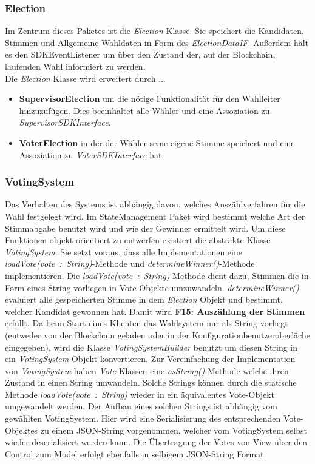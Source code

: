 \documentclass[parskip=full]{scrartcl}
\newcommand{\textitx}[1]{\mbox{\textit{#1}}}
\newcommand{\fakeparagraph}[1]{\textbf{#1}}
\begin{document}
		\subsubsection{Election}
		Im Zentrum dieses Paketes ist die \textitx{Election} Klasse. Sie speichert die Kandidaten, Stimmen und Allgemeine Wahldaten in Form des \textitx{ElectionDataIF}. Außerdem hält es den SDKEventListener um über den Zustand der, auf 
		der Blockchain, laufenden Wahl informiert zu werden.\\
		Die \textitx{Election} Klasse wird erweitert durch ...
		\begin{itemize}
			\item\fakeparagraph{SupervisorElection} um die nötige Funktionalität für den Wahlleiter hinzuzufügen. Dies beeinhaltet alle Wähler und eine Assoziation zu \textitx{SupervisorSDKInterface}.
			\item\fakeparagraph{VoterElection} in der der Wähler seine eigene Stimme speichert und eine Assoziation zu \textitx{VoterSDKInterface} hat.
		\end{itemize}
		
		\subsubsection{VotingSystem}
		Das Verhalten des Systems ist abhängig davon, welches Auszählverfahren für die Wahl festgelegt wird. Im StateManagement Paket wird bestimmt welche Art der Stimmabgabe benutzt wird und wie der Gewinner ermittelt wird.
		Um diese Funktionen objekt-orientiert zu entwerfen existiert die abstrakte Klasse \textitx{VotingSystem}. Sie setzt voraus, dass alle Implementationen eine \textitx{loadVote(vote : String)}-Methode und \textitx{determineWinner()}-Methode implementieren. Die \textitx{loadVote(vote : String)}-Methode dient dazu, Stimmen die in Form eines String vorliegen in Vote-Objekte umzuwandeln. \textitx{determineWinner()} evaluiert alle gespeicherten Stimme in dem \textitx{Election} Objekt und bestimmt, welcher Kandidat gewonnen hat. Damit wird \textbf{F15: Auszählung der Stimmen} erfüllt.
		Da beim Start eines Klienten das Wahlsystem nur als String vorliegt (entweder von der Blockchain geladen oder in der Konfigurationbenutzeroberläche eingegeben), wird die Klasse \textit{VotingSystemBuilder} benutzt um diesen String in ein \textitx{VotingSystem} Objekt konvertieren.
		Zur Vereinfachung der Implementation von \textitx{VotingSystem} haben \textitx{Vote}-Klassen eine \textitx{asString()}-Methode welche ihren Zustand in einen String umwandeln. Solche Strings können durch die statische Methode \textitx{loadVote(vote : String)} wieder in ein äquivalentes Vote-Objekt umgewandelt werden. Der Aufbau eines solchen Strings ist abhängig vom gewählten VotingSystem. Hier wird eine Serialisierung des entsprechenden Vote-Objektes zu einem JSON-String vorgenommen, welcher vom VotingSystem selbst wieder deserialisiert werden kann. Die Übertragung der Votes von View über den Control zum Model erfolgt ebenfalls in selbigem JSON-String Format.
	
\end{document}
